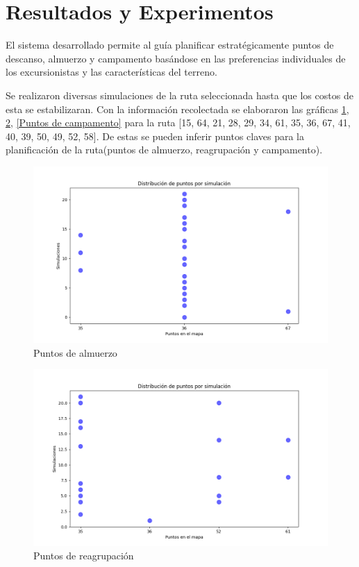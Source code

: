 \documentclass[10pt,twocolumn]{article}
\begin{document}
	
	\section{Resultados y Experimentos}

	El sistema desarrollado permite al guía planificar estratégicamente puntos de descanso, almuerzo y campamento basándose en las preferencias individuales de los excursionistas y las características del terreno. 
	
	Se realizaron diversas simulaciones de la ruta seleccionada hasta que los costos de esta se estabilizaran. Con la informaci\'on recolectada se elaboraron las gr\'aficas \ref{Puntos de almuerzo}, \ref{Puntos de reagrupacion}, \ref{Puntos de campamento} para la ruta [15, 64, 21, 28, 29, 34, 61, 35, 36, 67, 41, 40, 39, 50, 49, 52, 58]. De estas se pueden inferir puntos claves para la planificaci\'on de la ruta(puntos de almuerzo, reagrupaci\'on y campamento).
	
	\begin{figure}
		\centering
		\includegraphics[width=1\linewidth]{launch_stats}
		\caption{Puntos de almuerzo}
		\label{Puntos de almuerzo}
	\end{figure}
	
	\begin{figure}
		\centering
		\includegraphics[width=1\linewidth]{reagroup_stats}
		\caption{Puntos de reagrupaci\'on}
		\label{Puntos de reagrupacion}
	\end{figure}
\end{document}
